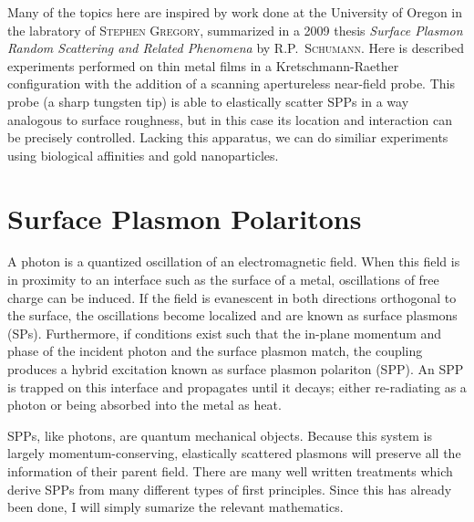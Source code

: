 \documentclass[a4paper,titlepage,onecolumn]{report}
\begin{document}
Many of the topics here are inspired by work done at the University of
Oregon in the labratory of \textsc{Stephen Gregory}, summarized in
a 2009 thesis \textit{Surface Plasmon Random Scattering and Related
Phenomena} \cite{schumann2009surface} by \textsc{R\@.P.\@~Schumann}.
Here is described experiments performed on thin metal films in a
Kretschmann-Raether configuration with the addition of a scanning
apertureless near-field probe.  This probe (a sharp tungsten tip) is able
to elastically scatter SPPs in a way analogous to surface roughness, but in
this case its location and interaction can be precisely controlled.
Lacking this apparatus, we can do similiar experiments using biological
affinities and gold nanoparticles.

\section{Surface Plasmon Polaritons}
A photon is a quantized oscillation of an electromagnetic field.  When this
field is in proximity to an interface such as the surface of a metal,
oscillations of free charge can be induced.  If the field is evanescent in
both directions orthogonal to the surface, the oscillations become
localized and are known as surface plasmons (SPs).  Furthermore, if
conditions exist such that the in-plane momentum and phase of the incident
photon and the surface plasmon match, the coupling produces a hybrid
excitation known as surface plasmon polariton (SPP).  An SPP is trapped on
this interface and propagates until it decays; either re-radiating as a
photon or being absorbed into the metal as heat.

SPPs, like photons, are quantum mechanical objects.  Because this system is
largely momentum-conserving, elastically scattered plasmons will preserve
all the information of their parent field.  There are many well written
treatments which derive SPPs from many different types of first principles.
Since this has already been done, I will simply sumarize the relevant
mathematics.
\end{document}
